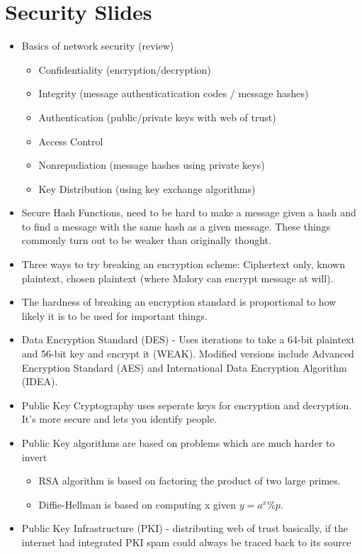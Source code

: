 \documentclass{scrartcl}
\begin{document}
\section*{Security Slides}
\begin{itemize}
\item Basics of network security (review)
\begin{itemize}
\item Confidentiality (encryption/decryption)
\item Integrity (message authenticatication codes / message hashes)
\item Authentication (public/private keys with web of trust)
\item Access Control
\item Nonrepudiation (message hashes using private keys)
\item Key Distribution (using key exchange algorithms)
\end{itemize}
\item Secure Hash Functions, need to be hard to make a message given a hash
and to find a message with the same hash as a given message. These things
commonly turn out to be weaker than originally thought.
\item Three ways to try breaking an encryption scheme: Ciphertext only,
known plaintext, chosen plaintext (where Malory can encrypt message at will).
\item The hardness of breaking an encryption standard is proportional
to how likely it is to be used for important things.
\item Data Encryption Standard (DES) - Uses iterations to take a 64-bit
plaintext and 56-bit key and encrypt it (WEAK). Modified versions include
Advanced Encryption Standard (AES) and International Data Encryption
Algorithm (IDEA).
\item Public Key Cryptography uses seperate keys for encryption and decryption.
It's more secure and lets you identify people.
\item Public Key algorithms are based on problems which are much harder to
invert
\begin{itemize}
\item RSA algorithm is based on factoring the product of two large primes.
\item Diffie-Hellman is based on computing x given $y=a^{x}\%p$.
\end{itemize}
\item Public Key Infrastructure (PKI) - distributing web of trust basically, if
the internet had integrated PKI spam could always be traced back to its source

\end{itemize}
\end{document}
